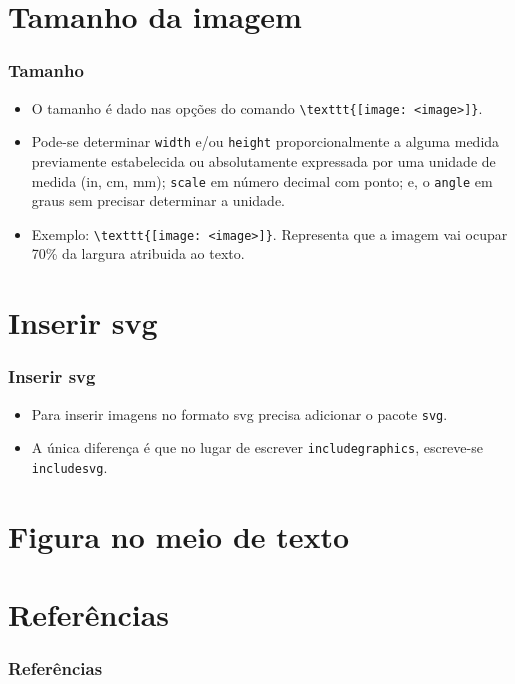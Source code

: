 \documentclass{beamer}
\begin{document}
\section{Tamanho da imagem}
\begin{frame}[fragile]
    \frametitle{Tamanho}

    \begin{itemize}
        \item O tamanho é dado nas opções do comando \lstinline[style=myStyleLatex]!\texttt{[image: <image>]}!.
        \item Pode-se determinar \texttt{width} e/ou \texttt{height} proporcionalmente a alguma medida previamente estabelecida ou absolutamente expressada por uma unidade de medida (in, cm, mm); \texttt{scale} em número decimal com ponto; e, o \texttt{angle} em graus sem precisar determinar a unidade.
        \item Exemplo: \lstinline[style=myStyleLatex]!\texttt{[image: <image>]}!. Representa que a imagem vai ocupar 70\% da largura atribuida ao texto.
    \end{itemize}

\end{frame}

\section{Inserir svg}
\begin{frame}
    \frametitle{Inserir svg}

    \begin{itemize}
        \item Para inserir imagens no formato svg precisa adicionar o pacote \texttt{svg}.
        \item A única diferença é que no lugar de escrever \texttt{includegraphics}, escreve-se \texttt{includesvg}.
    \end{itemize}

\end{frame}

\section{Figura no meio de texto}


\section{Referências}
\begin{frame}[allowframebreaks]
    \frametitle{Referências}
    \nocite{*}
    \printbibliography[keyword={inserirImagem}]
\end{frame}
\end{document}
